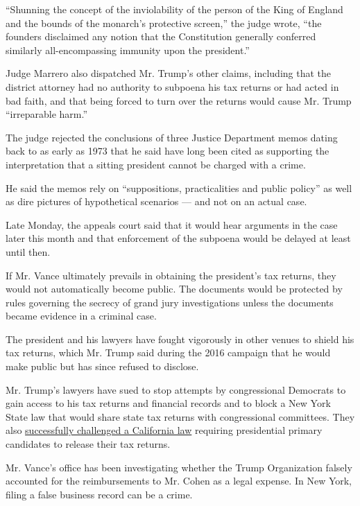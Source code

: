 ``Shunning the concept of the inviolability of the person of the King of
England and the bounds of the monarch's protective screen,'' the judge
wrote, ``the founders disclaimed any notion that the Constitution
generally conferred similarly all-encompassing immunity upon the
president.''

Judge Marrero also dispatched Mr. Trump's other claims, including that
the district attorney had no authority to subpoena his tax returns or
had acted in bad faith, and that being forced to turn over the returns
would cause Mr. Trump ``irreparable harm.''

The judge rejected the conclusions of three Justice Department memos
dating back to as early as 1973 that he said have long been cited as
supporting the interpretation that a sitting president cannot be charged
with a crime.

He said the memos rely on ``suppositions, practicalities and public
policy'' as well as dire pictures of hypothetical scenarios --- and not
on an actual case.

Late Monday, the appeals court said that it would hear arguments in the
case later this month and that enforcement of the subpoena would be
delayed at least until then.

If Mr. Vance ultimately prevails in obtaining the president's tax
returns, they would not automatically become public. The documents would
be protected by rules governing the secrecy of grand jury investigations
unless the documents became evidence in a criminal case.

The president and his lawyers have fought vigorously in other venues to
shield his tax returns, which Mr. Trump said during the 2016 campaign
that he would make public but has since refused to disclose.

Mr. Trump's lawyers have sued to stop attempts by congressional
Democrats to gain access to his tax returns and financial records and to
block a New York State law that would share state tax returns with
congressional committees. They also
\href{https://www.nytimes.com/2019/08/06/us/politics/california-trump-tax-returns.html?module=inline}{successfully
challenged a California law} requiring presidential primary candidates
to release their tax returns.

Mr. Vance's office has been investigating whether the Trump Organization
falsely accounted for the reimbursements to Mr. Cohen as a legal
expense. In New York, filing a false business record can be a crime.

